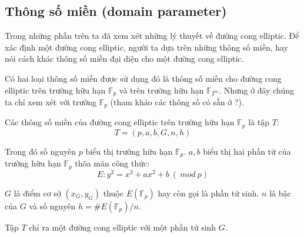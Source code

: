 \documentclass[a4paper,12pt]{report}
\begin{document}
\subsection*{Thông số miền (domain parameter)}
Trong những phần trên ta đã xem xét những lý thuyết về đường cong elliptic. Để xác định một đường cong elliptic, người ta dựa trên những thông số miền, hay nói cách khác thông số miền đại diện cho một đường cong elliptic.

Có hai loại thông số miền được sử dụng đó là thông số miền cho đường cong elliptic trên trường hữu hạn $\mathbb{F}_p$ và trên trường hữu hạn $\mathbb{F}_{2^m}$. Nhưng ở đây chúng ta chỉ xem xét với trường $\mathbb{F}_p$ (tham khảo các thông số có sẵn ở ?).

Các thông số miền của đường cong elliptic trên trường hữu hạn $\mathbb{F}_p$ là tập $T$:
\begin{displaymath}
T = (p, a, b, G, n, h)
\end{displaymath}

Trong đó số nguyên $p$ biểu thị trường hữu hạn $\mathbb{F}_p$. $a , b$ biểu thị hai phần tử của trường hữu hạn $\mathbb{F}_p$ thõa mãn công thức:
\begin{displaymath}
E: y^2 = x^3 + ax^2 + b \ (\ mod \ p)
\end{displaymath}

$G$ là điểm cơ sở $(x_G, y_G)$ thuộc $E(\mathbb{F}_p)$ hay còn gọi là phần tử sinh. $n$ là bậc của $G$ và số nguyên $h = \#E(\mathbb{F}_p)/n$.

Tập $T$ chỉ ra một đường cong elliptic với một phần tử sinh $G$.
\end{document}
